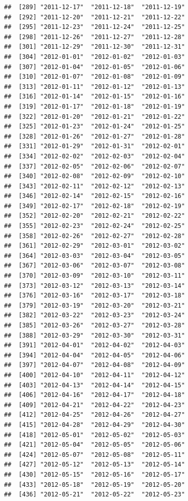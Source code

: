 \documentclass[10pt]{article}\usepackage[]{graphicx}\usepackage[]{color}
\makeatletter
\newenvironment{kframe}{%
 \def\at@end@of@kframe{}%
 \ifinner\ifhmode%
  \def\at@end@of@kframe{\end{minipage}}%
  \begin{minipage}{\columnwidth}%
 \fi\fi%
 \def\FrameCommand##1{\hskip\@totalleftmargin \hskip-\fboxsep
 \colorbox{shadecolor}{##1}\hskip-\fboxsep
     \hskip-\linewidth \hskip-\@totalleftmargin \hskip\columnwidth}%
 \MakeFramed {\advance\hsize-\width
   \@totalleftmargin\z@ \linewidth\hsize
   \@setminipage}}%
 {\par\unskip\endMakeFramed%
 \at@end@of@kframe}
\newenvironment{knitrout}{}{} %
\theoremstyle{plain}
\makeatother
\begin{document}
\begin{knitrout}
\begin{kframe}
\begin{verbatim}
##  [289] "2011-12-17"  "2011-12-18"  "2011-12-19" 
##  [292] "2011-12-20"  "2011-12-21"  "2011-12-22" 
##  [295] "2011-12-23"  "2011-12-24"  "2011-12-25" 
##  [298] "2011-12-26"  "2011-12-27"  "2011-12-28" 
##  [301] "2011-12-29"  "2011-12-30"  "2011-12-31" 
##  [304] "2012-01-01"  "2012-01-02"  "2012-01-03" 
##  [307] "2012-01-04"  "2012-01-05"  "2012-01-06" 
##  [310] "2012-01-07"  "2012-01-08"  "2012-01-09" 
##  [313] "2012-01-11"  "2012-01-12"  "2012-01-13" 
##  [316] "2012-01-14"  "2012-01-15"  "2012-01-16" 
##  [319] "2012-01-17"  "2012-01-18"  "2012-01-19" 
##  [322] "2012-01-20"  "2012-01-21"  "2012-01-22" 
##  [325] "2012-01-23"  "2012-01-24"  "2012-01-25" 
##  [328] "2012-01-26"  "2012-01-27"  "2012-01-28" 
##  [331] "2012-01-29"  "2012-01-31"  "2012-02-01" 
##  [334] "2012-02-02"  "2012-02-03"  "2012-02-04" 
##  [337] "2012-02-05"  "2012-02-06"  "2012-02-07" 
##  [340] "2012-02-08"  "2012-02-09"  "2012-02-10" 
##  [343] "2012-02-11"  "2012-02-12"  "2012-02-13" 
##  [346] "2012-02-14"  "2012-02-15"  "2012-02-16" 
##  [349] "2012-02-17"  "2012-02-18"  "2012-02-19" 
##  [352] "2012-02-20"  "2012-02-21"  "2012-02-22" 
##  [355] "2012-02-23"  "2012-02-24"  "2012-02-25" 
##  [358] "2012-02-26"  "2012-02-27"  "2012-02-28" 
##  [361] "2012-02-29"  "2012-03-01"  "2012-03-02" 
##  [364] "2012-03-03"  "2012-03-04"  "2012-03-05" 
##  [367] "2012-03-06"  "2012-03-07"  "2012-03-08" 
##  [370] "2012-03-09"  "2012-03-10"  "2012-03-11" 
##  [373] "2012-03-12"  "2012-03-13"  "2012-03-14" 
##  [376] "2012-03-16"  "2012-03-17"  "2012-03-18" 
##  [379] "2012-03-19"  "2012-03-20"  "2012-03-21" 
##  [382] "2012-03-22"  "2012-03-23"  "2012-03-24" 
##  [385] "2012-03-26"  "2012-03-27"  "2012-03-28" 
##  [388] "2012-03-29"  "2012-03-30"  "2012-03-31" 
##  [391] "2012-04-01"  "2012-04-02"  "2012-04-03" 
##  [394] "2012-04-04"  "2012-04-05"  "2012-04-06" 
##  [397] "2012-04-07"  "2012-04-08"  "2012-04-09" 
##  [400] "2012-04-10"  "2012-04-11"  "2012-04-12" 
##  [403] "2012-04-13"  "2012-04-14"  "2012-04-15" 
##  [406] "2012-04-16"  "2012-04-17"  "2012-04-18" 
##  [409] "2012-04-21"  "2012-04-22"  "2012-04-23" 
##  [412] "2012-04-25"  "2012-04-26"  "2012-04-27" 
##  [415] "2012-04-28"  "2012-04-29"  "2012-04-30" 
##  [418] "2012-05-01"  "2012-05-02"  "2012-05-03" 
##  [421] "2012-05-04"  "2012-05-05"  "2012-05-06" 
##  [424] "2012-05-07"  "2012-05-08"  "2012-05-11" 
##  [427] "2012-05-12"  "2012-05-13"  "2012-05-14" 
##  [430] "2012-05-15"  "2012-05-16"  "2012-05-17" 
##  [433] "2012-05-18"  "2012-05-19"  "2012-05-20" 
##  [436] "2012-05-21"  "2012-05-22"  "2012-05-23" 

\end{verbatim}
\end{kframe}
\end{knitrout}
\end{document}
